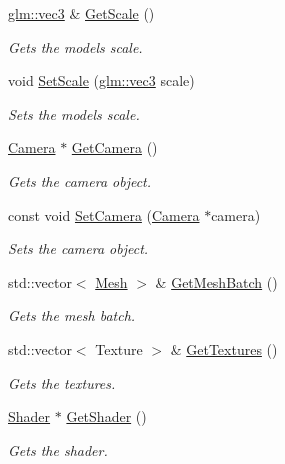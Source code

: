\begin{CompactItemize}
\hyperlink{group__core__types_g1c47e8b3386109bc992b6c48e91b0be7}{glm::vec3} \& \hyperlink{class_model_a0fecf0d42fd4ab4d3c4a49a84bd830e}{GetScale} ()
\begin{CompactList}\small\item\em Gets the models scale. \item\end{CompactList}\item 
void \hyperlink{class_model_76860d36c983eb38250588899775aab7}{SetScale} (\hyperlink{group__core__types_g1c47e8b3386109bc992b6c48e91b0be7}{glm::vec3} scale)
\begin{CompactList}\small\item\em Sets the models scale. \item\end{CompactList}\item 
\hyperlink{class_camera}{Camera} $\ast$ \hyperlink{class_model_8c6429a35a1376657357e6e770470f13}{GetCamera} ()
\begin{CompactList}\small\item\em Gets the camera object. \item\end{CompactList}\item 
const void \hyperlink{class_model_5efc69bc9e86c4946aec2be4b190351f}{SetCamera} (\hyperlink{class_camera}{Camera} $\ast$camera)
\begin{CompactList}\small\item\em Sets the camera object. \item\end{CompactList}\item 
std::vector$<$ \hyperlink{class_mesh}{Mesh} $>$ \& \hyperlink{class_model_e8189e0eb940a7a994591ca71dafae5b}{GetMeshBatch} ()
\begin{CompactList}\small\item\em Gets the mesh batch. \item\end{CompactList}\item 
std::vector$<$ Texture $>$ \& \hyperlink{class_model_3ba990a64ec154e543ffe4a529220cc4}{GetTextures} ()
\begin{CompactList}\small\item\em Gets the textures. \item\end{CompactList}\item 
\hyperlink{class_shader}{Shader} $\ast$ \hyperlink{class_model_985c54c42525ea8e9885977eff7027de}{GetShader} ()
\begin{CompactList}\small\item\em Gets the shader. \item\end{CompactList}\item 

\end{CompactItemize}
